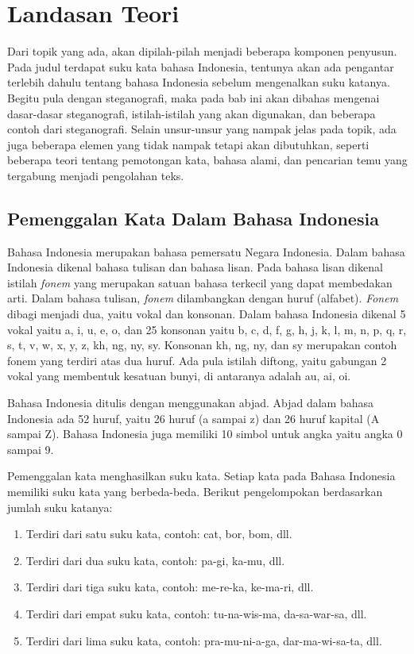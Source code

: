 \chapter{Landasan Teori}
\label{chap:landasan_teori}

Dari topik yang ada, akan dipilah-pilah menjadi beberapa komponen penyusun. Pada judul terdapat suku kata bahasa Indonesia, tentunya akan ada pengantar terlebih dahulu tentang bahasa Indonesia sebelum mengenalkan suku katanya. Begitu pula dengan steganografi, maka pada bab ini akan dibahas mengenai dasar-dasar steganografi, istilah-istilah yang akan digunakan, dan beberapa contoh dari steganografi. Selain unsur-unsur yang nampak jelas pada topik, ada juga beberapa elemen yang tidak nampak tetapi akan dibutuhkan, seperti beberapa teori tentang pemotongan kata, bahasa alami, dan pencarian temu yang tergabung menjadi pengolahan teks.

\section{Pemenggalan Kata Dalam Bahasa Indonesia \cite{eyd:2009}}
Bahasa Indonesia merupakan bahasa pemersatu Negara Indonesia. Dalam bahasa Indonesia dikenal bahasa tulisan dan bahasa lisan. Pada bahasa lisan dikenal istilah \textit{fonem} yang merupakan satuan bahasa terkecil yang dapat membedakan arti. Dalam bahasa tulisan, \textit{fonem} dilambangkan dengan huruf (alfabet). \textit{Fonem} dibagi menjadi dua, yaitu vokal dan konsonan. Dalam bahasa Indonesia dikenal 5 vokal yaitu a, i, u, e, o, dan 25 konsonan yaitu b, c, d, f, g, h, j, k, l, m, n, p, q, r, s, t, v, w, x, y, z, kh, ng, ny, sy. Konsonan kh, ng, ny, dan sy merupakan contoh fonem yang terdiri atas dua huruf. Ada pula istilah diftong, yaitu gabungan 2 vokal yang membentuk kesatuan bunyi, di antaranya adalah au, ai, oi.

Bahasa Indonesia ditulis dengan menggunakan abjad. Abjad dalam bahasa Indonesia ada 52 huruf, yaitu 26 huruf (a sampai z) dan 26 huruf kapital (A sampai Z). Bahasa Indonesia juga memiliki 10 simbol untuk angka yaitu angka 0 sampai 9.

Pemenggalan kata menghasilkan suku kata. Setiap kata pada Bahasa Indonesia memiliki suku kata yang berbeda-beda. 
Berikut pengelompokan berdasarkan jumlah suku katanya:

\begin{enumerate}
	\item Terdiri dari satu suku kata, contoh: cat, bor, bom, dll.
	\item Terdiri dari dua suku kata, contoh: pa-gi, ka-mu, dll.
	\item Terdiri dari tiga suku kata, contoh: me-re-ka, ke-ma-ri, dll.
	\item Terdiri dari empat suku kata, contoh: tu-na-wis-ma, da-sa-war-sa, dll.
	\item Terdiri dari lima suku kata, contoh: pra-mu-ni-a-ga, dar-ma-wi-sa-ta, dll.
\end{enumerate}

